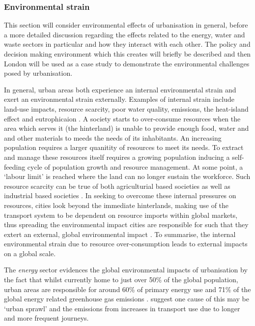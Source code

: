 \subsubsection*{Environmental strain} 
This section will consider environmental effects of urbanisation in general, before a more detailed discussion regarding the effects related to the energy, water and waste sectors in particular and how they interact with each other. The policy and decision making environment which this creates will briefly be described and then London will be used as a case study to demonstrate the environmental challenges posed by urbanisation.

In general, urban areas both experience an internal environmental strain and exert an environmental strain externally. Examples of internal strain include land-use impacts, resource scarcity, poor water quality, emissions, the heat-island effect and eutrophicaion \citep{Cao2011}. A society starts to over-consume resources when the area which serves it (the hinterland) is unable to provide enough food, water and and other materials to meeds the needs of its inhabitants. An increasing population requires a larger quanitity of resources to meet its needs. To extract and manage these resources itself requires a growing population inducing a self-feeding cycle of population  growth and resource management. At some point, a `labour limit' is reached where the land can no longer sustain the workforce. Such resource scarcity can be true of both agriculturial based societies as well as industrial based societies \citep{Haberl2001a, Haberl2001b, Gr2003}. In seeking to overcome these internal pressures on resources, cities look beyond the immediate hinterlands, making use of the transport system to be dependent on resource imports within global markets, thus spreading the environmental impact cities are responsible for such that they extert an external, global environmental impact \citep{Agudelo-Vera2011}. To summarise, the internal environmental strain due to resource over-consumption leads to external impacts on a global scale.

The \emph{energy} sector evidences the global environmental impacts of urbanisation by the fact that whilst currently home to just over 50\% of the global population, urban areas are responsible for around 60\% of primary energy use and 71\% of the global energy related greenhouse gas emissions \citep{IEA2008}. \citet{Grubler2009} suggest one cause of this may be `urban sprawl' and the emissions from increases in transport use due to longer and more frequent journeys.

